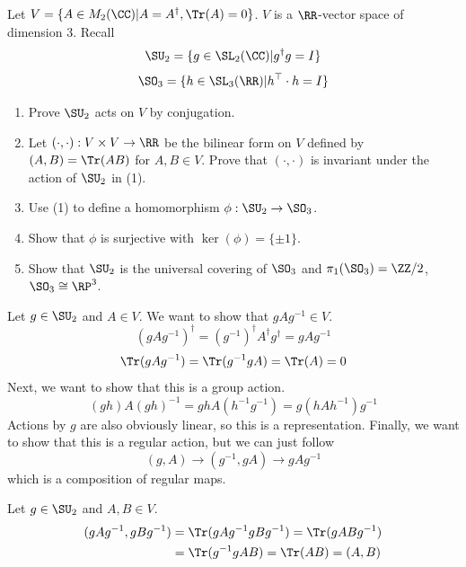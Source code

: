 \documentclass[11pt, headheight=30pt]{scrartcl}
\begin{document}
\begin{prob}
    Let $V = \{A\in M_2(\CC) | A = A^\dagger, \Tr(A) = 0\}$.
    $V$ is a $\RR$-vector space of dimension $3$.
    Recall
    \[
        \SU_2 = \{g\in \SL_2(\CC) | g^\dagger g = I\}
    \]
    \[
        \SO_3 = \{h\in \SL_3(\RR) | h^\top\cdot h = I\}
    \]
    \begin{enumerate}
        \item Prove $\SU_2$ acts on $V$ by conjugation.
        \item Let $(\cdot, \cdot): V\times V\to \RR$ be the bilinear form
        on $V$ defined by $(A,B) = \Tr(AB)$ for $A,B\in V$.
        Prove that $(\cdot, \cdot)$ is invariant under the action of $\SU_2$ in (1).
        \item Use (1) to define a homomorphism $\phi: \SU_2\to \SO_3$.
        \item Show that $\phi$ is surjective with $\ker(\phi) = \{\pm 1\}$.
        \item Show that $\SU_2$ is the universal covering of $\SO_3$ and
        $\pi_1(\SO_3) = \ZZ/2$, $\SO_3 \cong \RP^3$.
    \end{enumerate} 
\end{prob}

\begin{psec*}
    Let $g\in \SU_2$ and $A\in V$. We want to show that $gAg^{-1}\in V$.
    \[
        (gAg^{-1})^\dagger = (g^{-1})^\dagger A^\dagger g^\dagger
        = gAg^{-1}
    \]
    \[
        \Tr(gAg^{-1}) = \Tr(g^{-1}gA) = \Tr(A) = 0
    \]
    Next, we want to show that this is a group action.
    \[
        (gh)A(gh)^{-1} = ghA(h^{-1}g^{-1}) = g(hAh^{-1})g^{-1}
    \]
    Actions by $g$ are also obviously linear, so this
    is a representation.
    Finally, we want to show that this is a regular action,
    but we can just follow
    \[
        (g,A)\to (g^{-1}, gA) \to gAg^{-1}
    \]
    which is a composition of regular maps.
\end{psec*}

\begin{psec*}
    Let $g\in \SU_2$ and $A,B\in V$.
    \begin{align*}
        (gAg^{-1}, gBg^{-1}) &= \Tr(gAg^{-1}gBg^{-1}) = \Tr(gABg^{-1}) \\
        &= \Tr(g^{-1}gAB) = \Tr(AB) = (A,B)
    \end{align*}
\end{psec*}
\end{document}

